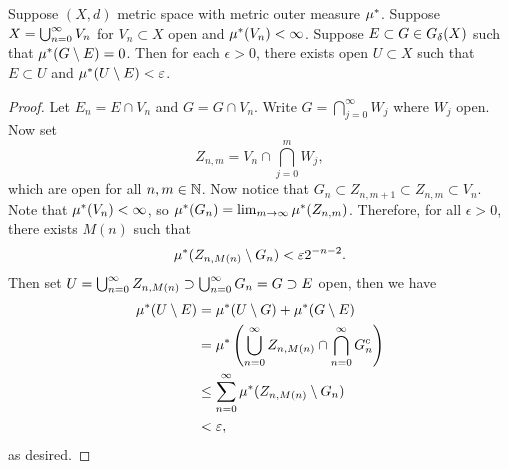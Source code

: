 \documentclass[a4paper]{article}
\begin{document}
\begin{lemma}
Suppose $(X, d)$ metric space with metric outer measure 
$\mu^*$. Suppose $X = \bigcup_{n=0}^\infty V_n$ for $V_n \subset X$ open and 
$\mu^*(V_n) < \infty$. Suppose $E \subset G \in G_\delta(X)$ such that 
$\mu^*(G \setminus E) = 0$. Then for each $\epsilon > 0$, 
there exists open $U \subset X$ such that $E \subset U$
and $\mu^*(U \setminus E) < \varepsilon$.  

\end{lemma}

\begin{proof}

Let $E_n = E \cap V_n$ and $G = G \cap V_n$. Write 
$G = \bigcap_{j=0}^\infty W_j$ where $W_j$ open. 
Now set 
\[
Z_{n, m} = V_n \cap \bigcap_{j=0}^m W_j,
\]
which are open for all $n, m \in \mathbb{N}$.
Now notice that $G_n \subset Z_{n, m+1} \subset Z_{n,m} 
\subset V_n$. Note that $\mu^*(V_n) < \infty$, so 
$\mu^*(G_n) = \lim_{m \to \infty} \mu^*(Z_{n, m})$. Therefore, 
for all $\epsilon > 0$, there exists $M(n)$ such that 
\[
\mu^*(Z_{n, M(n)} \setminus G_n) < \varepsilon 2^{-n-2}.
\]
Then set $U = \bigcup_{n=0}^\infty Z_{n, M(n)} \supset \bigcup_{n=0}^\infty G_n = G 
\supset E$ open, then we have 
\[
\begin{aligned}
\mu^*(U \setminus E) 
&= \mu^*(U \setminus G) + \mu^*(G \setminus E)  \\
&= \mu^* \left( \bigcup_{n=0}^\infty Z_{n, M(n)} \cap
\bigcap_{n=0}^\infty G_n^c \right) \\
&\leq \sum_{n=0}^\infty \mu^*(Z_{n, M(n)} \setminus G_n) \\
&< \varepsilon,
\end{aligned}
\]
as desired.


\end{proof}
\end{document}
